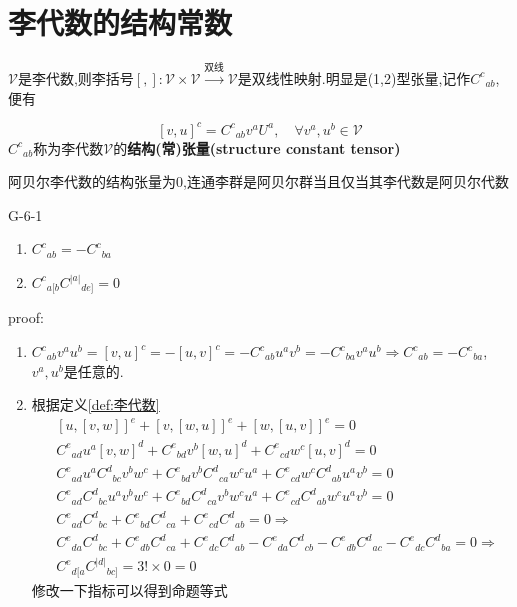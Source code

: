 \documentclass[../main.tex]{subfiles}
\begin{document}
 \chapter{李代数的结构常数}
 $\mathscr{V}$是李代数,则李括号$[,]:\mathscr{V}\times \mathscr{V} \xrightarrow{\text{双线}} \mathscr{V}$是双线性映射.明显是(1,2)型张量,记作$C^c{}_{ab}$,便有
 \begin{definition}
 $$[v,u]^c = C^c{}_{ab}v^aU^a,\quad \forall v^a,u^b \in \mathscr{V}$$
 $C^c{}_{ab}$称为李代数$\mathscr{V}$的\textbf{结构(常)张量(structure constant tensor)}
 \end{definition}
 \begin{note}
 阿贝尔李代数的结构张量为0,连通李群是阿贝尔群当且仅当其李代数是阿贝尔代数
 \end{note}
\begin{theorem}{}{G-6-1}
	\begin{enumerate}
		\item $C^{c}{}_{ab}=-C^{c}{}_{ba}$
		\item $C^{c}{}_{a[b}C^{|a|}{}_{de]} = 0$
	\end{enumerate}
\end{theorem}
 proof:\begin{enumerate}
     \item $C^{c}{}_{ab}v^au^b = [v,u]^c = -[u,v]^c = -C^{c}{}_{ab}u^av^b = -C^{c}{}_{ba}v^au^b \Rightarrow C^{c}{}_{ab} = -C^{c}{}_{ba}$,$v^a,u^b$是任意的.
     \item 根据定义\ref{def:李代数}
     \begin{align*}
         &[u, [v, w]]^e + [v, [w, u]]^e + [w, [u, v]]^e = 0\\
         &C^e{}_{ad}u^a[v,w]^d + C^e{}_{bd}v^b[w,u]^d + C^e{}_{cd}w^c[u,v]^d =0\\
         &C^e{}_{ad}u^aC^d{}_{bc}v^bw^c + C^e{}_{bd}v^bC^d{}_{ca}w^cu^a + C^e{}_{cd}w^cC^d{}_{ab}u^av^b =0\\
         &C^e{}_{ad}C^d{}_{bc}u^av^bw^c + C^e{}_{bd}C^d{}_{ca}v^bw^cu^a + C^e{}_{cd}C^d{}_{ab}w^cu^av^b =0\\
         &C^e{}_{ad}C^d{}_{bc} + C^e{}_{bd}C^d{}_{ca} + C^e{}_{cd}C^d{}_{ab} =0\Rightarrow\\
         &C^e{}_{da}C^d{}_{bc} + C^e{}_{db}C^d{}_{ca} + C^e{}_{dc}C^d{}_{ab} -C^e{}_{da}C^d{}_{cb} - C^e{}_{db}C^d{}_{ac} - C^e{}_{dc}C^d{}_{ba} =0 \Rightarrow\\
         &C^e{}_{d[a}C^{|d|}{}_{bc]} = 3!\times0 = 0
     \end{align*}
     修改一下指标可以得到命题等式
 \end{enumerate}
\end{document}
